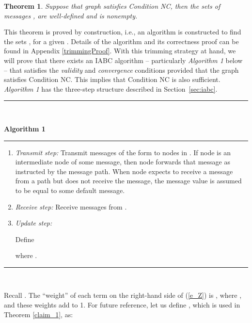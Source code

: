 \documentclass[letterpaper, 11pt]{article}
\newtheorem{theorem}{Theorem}[section]
\begin{document}
\begin{theorem}
\label{trimming}
Suppose that graph  satisfies Condition NC, then the sets of messages ,  are well-defined and   is nonempty.
\end{theorem}
This theorem is proved by construction, i.e., an algorithm is constructed to find the sets ,  for a given . Details of the algorithm and its correctness proof can be found in Appendix \ref{trimmingProof}. With this trimming strategy at hand, 
we will prove that there exists an IABC algorithm -- particularly
{\em Algorithm 1} below -- that satisfies
the {\em validity} and {\em convergence} conditions provided that the
graph  satisfies Condition NC. This implies that Condition NC is also sufficient. {\em Algorithm 1} has the three-step structure described
in Section~\ref{sec:iabc}.







\vspace*{8pt}\hrule
{\,

\bf Algorithm 1}
\vspace*{4pt}\hrule

\begin{enumerate}
\label{algorithm}
\item {\em Transmit step:} Transmit messages of the form  to nodes in . If node  is an intermediate node of some message, then node  forwards that message as instructed by the message path.
    When node  expects to receive a message from a path but does not receive the message, the message value is assumed to be equal to some default message.

\item {\em Receive step:} Receive messages from .


\item {\em Update step:}


Define

where .


\end{enumerate}
\hrule
\,

Recall .
The ``weight'' of each term on the right-hand side of (\ref{e_Z}) is , where , and these weights add to 1.
For future reference, let us define , which is used in Theorem \ref{claim_1}, as:
\end{document}
